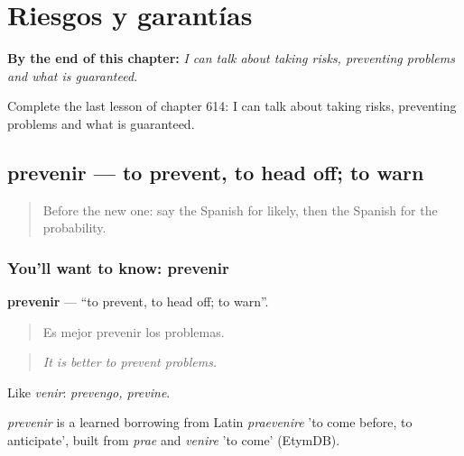 
\chapter{Riesgos y garantías}
\label{ch:es-riesgos-y-garantias}

\begin{chapteropening}
\textbf{By the end of this chapter:} \emph{I can talk about taking risks, preventing problems and what is guaranteed.}

Complete the last lesson of chapter 614: I can talk about taking risks, preventing problems and what is guaranteed.
\end{chapteropening}

\section[prevenir]{prevenir — to prevent, to head off; to warn}

\label{lesson:ES-C614-prevenir}



\begin{quote}
Before the new one: say the Spanish for likely, then the Spanish for the probability.
\end{quote}

\subsection*{You'll want to know: prevenir}
\textbf{prevenir} — \textquotedblleft{}to prevent, to head off; to warn\textquotedblright{}.

\begin{quote}
Es mejor prevenir los problemas.
\end{quote}

\begin{quote}
\emph{It is better to prevent problems.}
\end{quote}

Like \emph{venir}: \emph{prevengo, previne}.

\begin{cousinweb}
\emph{prevenir} is a learned borrowing from Latin \emph{praevenire} 'to come before, to anticipate', built from \emph{prae} and \emph{venire} 'to come' (EtymDB).
\end{cousinweb}

